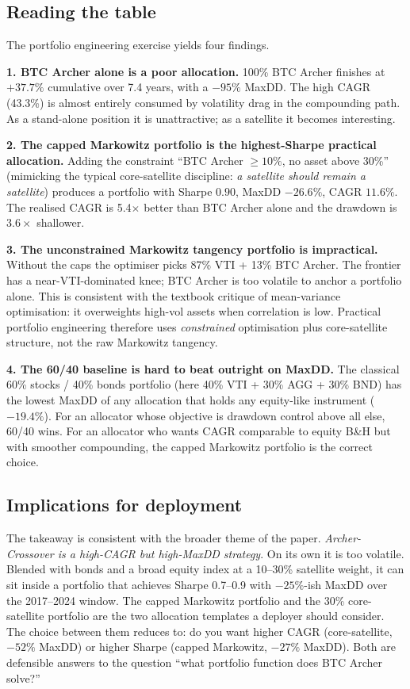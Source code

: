 \documentclass[11pt,a4paper]{article}
\begin{document}
\subsection{Reading the table}

The portfolio engineering exercise yields four findings.

\textbf{1. BTC Archer alone is a poor allocation.} 100\% BTC Archer finishes at
$+37.7\%$ cumulative over 7.4 years, with a $-95\%$ MaxDD. The high CAGR (43.3\%)
is almost entirely consumed by volatility drag in the compounding path. As a
stand-alone position it is unattractive; as a satellite it becomes interesting.

\textbf{2. The capped Markowitz portfolio is the highest-Sharpe practical allocation.} Adding the constraint ``BTC Archer $\ge 10\%$, no asset above 30\%'' (mimicking the typical core-satellite discipline: \emph{a satellite should remain a satellite}) produces a portfolio with Sharpe $0.90$, MaxDD $-26.6\%$, CAGR $11.6\%$. The realised CAGR is 5.4$\times$ better than BTC Archer alone and the drawdown is $3.6\times$ shallower.

\textbf{3. The unconstrained Markowitz tangency portfolio is impractical.} Without the caps the optimiser picks 87\% VTI + 13\% BTC Archer. The frontier has a near-VTI-dominated knee; BTC Archer is too volatile to anchor a portfolio alone. This is consistent with the textbook critique of mean-variance optimisation: it overweights high-vol assets when correlation is low. Practical portfolio engineering therefore uses \emph{constrained} optimisation plus core-satellite structure, not the raw Markowitz tangency.

\textbf{4. The 60/40 baseline is hard to beat outright on MaxDD.} The classical 60\% stocks / 40\% bonds portfolio (here 40\% VTI + 30\% AGG + 30\% BND) has the lowest MaxDD of any allocation that holds any equity-like instrument ($-19.4\%$). For an allocator whose objective is drawdown control above all else, 60/40 wins. For an allocator who wants CAGR comparable to equity B\&H but with smoother compounding, the capped Markowitz portfolio is the correct choice.

\subsection{Implications for deployment}

The takeaway is consistent with the broader theme of the paper. \emph{Archer-Crossover is a high-CAGR but high-MaxDD strategy}. On its own it is too volatile. Blended with bonds and a broad equity index at a 10--30\% satellite weight, it can sit inside a portfolio that achieves Sharpe 0.7--0.9 with $-25\%$-ish MaxDD over the 2017--2024 window. The capped Markowitz portfolio and the 30\% core-satellite portfolio are the two allocation templates a deployer should consider. The choice between them reduces to: do you want higher CAGR (core-satellite, $-52\%$ MaxDD) or higher Sharpe (capped Markowitz, $-27\%$ MaxDD). Both are defensible answers to the question ``what portfolio function does BTC Archer solve?''
\end{document}
